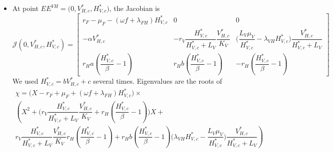 \documentclass{article}
\newcommand{\lf}{\lambda_{FH}}
\newcommand{\lv}{\lambda_{VH}}
\newcommand{\FHterme}{\omega f + \lf}
\begin{document}
\begin{itemize}
One root is $r_V \dfrac{H^*_{F, c}}{L_V + H^*_{F, c}} - \lv H^*_{F, c} -\alpha F^*_{H, c} -  \mu_V$. The two others have negative real parts if the coefficients of the second degree polynomial are both positive, which is the case if $H^*_{F, c} > \beta$.
Finally, $EE^{FH}$ is AS if
\begin{subequations}
    \begin{empheq}[left={\empheqlbrace\,}]{align}
    & \dfrac{r_V}{\mu_V + H^*_{F, c} \lv +\alpha F^*_{H, c}} \dfrac{H^*_{F, c}}{H^*_{F, c} + L_V} < 1 \\
    &1 < \dfrac{H^*_{F, c}}{\beta}
    \end{empheq}
\end{subequations}
with $F^*_{H, c} = K_F \left( \dfrac{1 - \dfrac{\mu_F}{r_F} - c \dfrac{\omega f + \lf}{r_F}}{1 + a K_F \dfrac{\omega f + \lf}{r_F}} \right)$ and $H^*_{F, c} = a F^*_{H, c} + c$.


\item At point $EE^{VH} = \Big(0, V^*_{H, c}, H^*_{V, c})$, the Jacobian is
\begin{equation}
\mathcal{J}(0, V^*_{H, c}, H^*_{V, c}) = \begin{bmatrix}
r_F - \mu_F - (\FHterme)H^*_{V, c}  & 0 & 0 \\
-\alpha V^*_{H, c} & -r_V\dfrac{H^*_{V, c}}{H^*_{V, c} + L_V} \dfrac{V^*_{H, c}}{K_V} & \Big(\dfrac{L_V\mu_V}{H^*_{V, c}} - \lv H^*_{V, c}) \dfrac{V^*_{H, c}}{H^*_{V, c} + L_V} \\
r_H a (\dfrac{H^*_{V, c}}{\beta} - 1) & r_H b (\dfrac{H^*_{V, c}}{\beta} - 1) & -r_H(\dfrac{H^*_{V, c}}{\beta} - 1)
\end{bmatrix}
\end{equation}
We used $H^*_{V, c} = b V^*_{H, c} + c$ several times. Eigenvalues are the roots of 
\begin{multline}
\chi = \Big(X - r_F + \mu_F + (\FHterme)H^*_{V, c} \Big) \times \\
\left(X^2 + \Big(r_V  \dfrac{H^*_{V, c}}{H^*_{V, c}+L_V}\dfrac{V^*_{H, c}}{K_V} + r_H(\dfrac{H^*_{V, c}}{\beta} - 1)\Big)X + \right.\\ \left.
 r_V  \dfrac{H^*_{V, c}}{H^*_{V, c}+L_V}\dfrac{V^*_{H, c}}{K_V} r_H(\dfrac{H^*_{V, c}}{\beta} - 1) + r_Hb(\dfrac{H^*_{V, c}}{\beta} - 1) \Big(\lv H^*_{V, c} - \dfrac{L_V \mu_V}{H^*_{V, c}} \Big) \dfrac{V^*_{H, c}}{H^*_{V, c} + L_V} \right)
 \label{stab:chi VH}
\end{multline}


\end{itemize}
\end{document}
